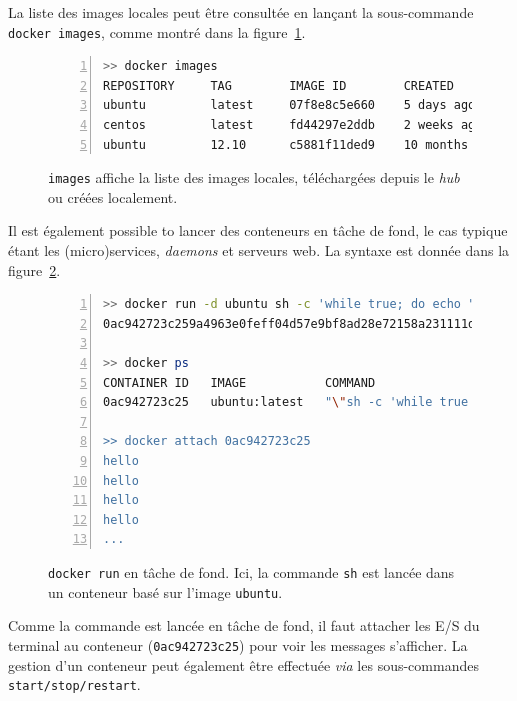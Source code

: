 \documentclass[a4paper]{article}
\begin{document}
La liste des images locales peut \^etre consult\'ee en lan\c cant la sous-commande
\texttt{docker~images}, comme montr\'e dans la figure~\ref{fig-docker-images}.

\begin{figure}[h]
	\begin{lstlisting}[language=sh,
		basicstyle=\tiny,
		frame=trbl,
		numbers=left,
		showstringspaces=false,
	stringstyle=\ttfamily]
>> docker images
REPOSITORY     TAG        IMAGE ID        CREATED             VIRTUAL SIZE
ubuntu         latest     07f8e8c5e660    5 days ago          188.3 MB
centos         latest     fd44297e2ddb    2 weeks ago         215.7 MB
ubuntu         12.10      c5881f11ded9    10 months ago       172.1 MB
\end{lstlisting}
\caption{\label{fig-docker-images}\texttt{images} affiche la liste des
	images locales, t\'el\'echarg\'ees depuis le \emph{hub} ou cr\'e\'ees
	localement.}
\end{figure}

Il est \'egalement possible to lancer des conteneurs en t\^ache de fond, le cas
typique \'etant les (micro)services, \emph{daemons} et serveurs web.
La syntaxe est donn\'ee dans la figure~\ref{fig-docker-run-detached}.

\begin{figure}[h]
	\begin{lstlisting}[language=sh,
		basicstyle=\tiny,
		frame=trbl,
		numbers=left,
		showstringspaces=false,
	stringstyle=\ttfamily]
>> docker run -d ubuntu sh -c 'while true; do echo "hello"; sleep 1; done;'
0ac942723c259a4963e0feff04d57e9bf8ad28e72158a231111d8f3718d960e6

>> docker ps
CONTAINER ID   IMAGE           COMMAND                CREATED         STATUS
0ac942723c25   ubuntu:latest   "\"sh -c 'while true   6 seconds ago   Up 3 seconds

>> docker attach 0ac942723c25
hello
hello
hello
hello
...
\end{lstlisting}
\caption{\label{fig-docker-run-detached}\texttt{docker run} en t\^ache de fond.
Ici, la commande \texttt{sh} est lanc\'ee dans un conteneur bas\'e sur l'image \texttt{ubuntu}.}
\end{figure}

Comme la commande est lanc\'ee en t\^ache de fond, il faut attacher les
E/S du terminal au conteneur (\texttt{0ac942723c25})
pour voir les messages s'afficher.
La gestion d'un conteneur peut \'egalement \^etre effectu\'ee \emph{via} les
sous-commandes \texttt{start/stop/restart}.
\end{document}
